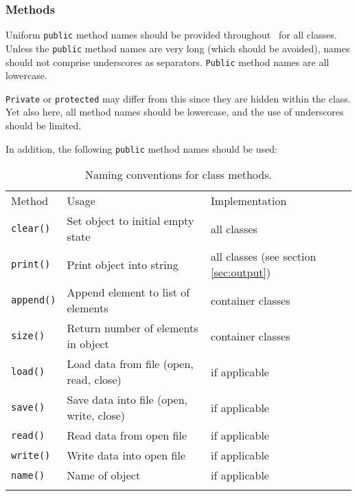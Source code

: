 \documentclass{article}[12pt,a4]
\begin{document}
\subsubsection{Methods}

Uniform {\tt public} method names should be provided throughout \this\ for all classes.
Unless the {\tt public} method names are very long (which should be avoided), names
should not comprise underscores as separators.
{\tt Public} method names are all lowercase.

{\tt Private} or {\tt protected} may differ from this since they are hidden within the class.
Yet also here, all method names should be lowercase, and the use of underscores
should be limited.
 
In addition, the following {\tt public} method names should be used:

\begin{table}[!h]
\caption{Naming conventions for class methods.
\label{tab:naming}}
\begin{center}
\begin{tabular}{lll}
\hline
\hline
\noalign{\smallskip}
Method & Usage & Implementation \\
\noalign{\smallskip}
\hline
\noalign{\smallskip}
{\tt clear()} & Set object to initial empty state & all classes \\
{\tt print()} & Print object into string & all classes (see section \ref{sec:output}) \\
{\tt append()} & Append element to list of elements & container classes \\
{\tt size()} & Return number of elements in object & container classes \\
{\tt load()} & Load data from file (open, read, close) & if applicable \\
{\tt save()} & Save data into file (open, write, close) & if applicable \\
{\tt read()} & Read data from open file & if applicable \\
{\tt write()} & Write data into open file & if applicable \\
{\tt name()} & Name of object & if applicable \\
\noalign{\smallskip}
\hline
\end{tabular}
\end{center}
\end{table}
\end{document}
